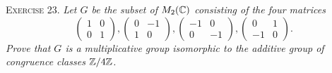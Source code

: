 \documentclass[11pt, leqno]{article}
\begin{document}
\textsc{Exercise 23}. \emph{Let $G$ be the subset of $M_2(\mathbb{C})$ consisting of the four matrices 
\begin{displaymath}
  \begin{pmatrix} 1 & 0 \\ 0 & 1 \end{pmatrix},
  \begin{pmatrix} 0 & -1 \\ 1 & 0 \end{pmatrix},
  \begin{pmatrix} -1 & 0 \\ 0 & -1 \end{pmatrix},
  \begin{pmatrix} 0 & 1 \\ -1 & 0 \end{pmatrix}.
\end{displaymath}
Prove that $G$ is a multiplicative group isomorphic to the additive group of congruence classes $\mathbb{Z}/4\mathbb{Z}$.}
\end{document}
